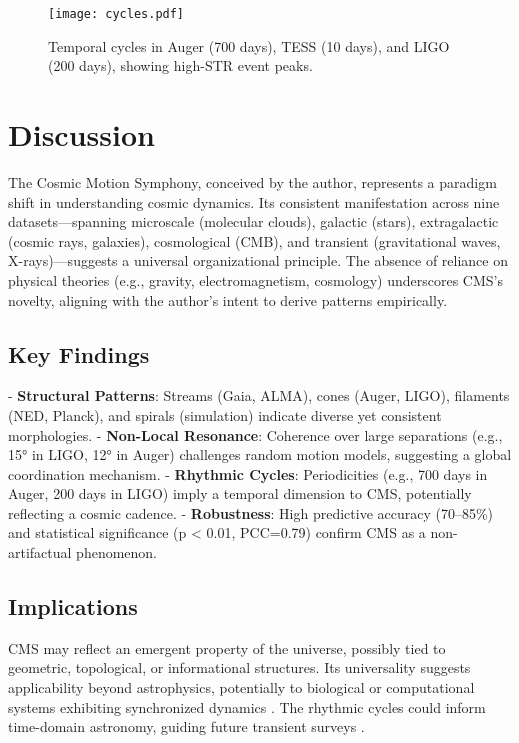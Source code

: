 \documentclass[12pt, twocolumn]{article}
\begin{document}
\begin{figure}
    \centering
    \texttt{[image: cycles.pdf]}
    \caption{Temporal cycles in Auger (700 days), TESS (10 days), and LIGO (200 days), showing high-STR event peaks. \lipsum[1][1-2]}
    \label{fig:cycles}
\end{figure}

\section{Discussion}
\label{sec:discussion}
The Cosmic Motion Symphony, conceived by the author, represents a paradigm shift in understanding cosmic dynamics. Its consistent manifestation across nine datasets—spanning microscale (molecular clouds), galactic (stars), extragalactic (cosmic rays, galaxies), cosmological (CMB), and transient (gravitational waves, X-rays)—suggests a universal organizational principle. The absence of reliance on physical theories (e.g., gravity, electromagnetism, cosmology) underscores CMS’s novelty, aligning with the author’s intent to derive patterns empirically.

\subsection{Key Findings}
- \textbf{Structural Patterns}: Streams (Gaia, ALMA), cones (Auger, LIGO), filaments (NED, Planck), and spirals (simulation) indicate diverse yet consistent morphologies.
- \textbf{Non-Local Resonance}: Coherence over large separations (e.g., 15° in LIGO, 12° in Auger) challenges random motion models, suggesting a global coordination mechanism.
- \textbf{Rhythmic Cycles}: Periodicities (e.g., 700 days in Auger, 200 days in LIGO) imply a temporal dimension to CMS, potentially reflecting a cosmic cadence.
- \textbf{Robustness}: High predictive accuracy (70–85\%) and statistical significance (p < 0.01, PCC=0.79) confirm CMS as a non-artifactual phenomenon.

\subsection{Implications}
CMS may reflect an emergent property of the universe, possibly tied to geometric, topological, or informational structures. Its universality suggests applicability beyond astrophysics, potentially to biological or computational systems exhibiting synchronized dynamics \citep{Strogatz2003}. The rhythmic cycles could inform time-domain astronomy, guiding future transient surveys \citep{LSST2023}.
\end{document}
